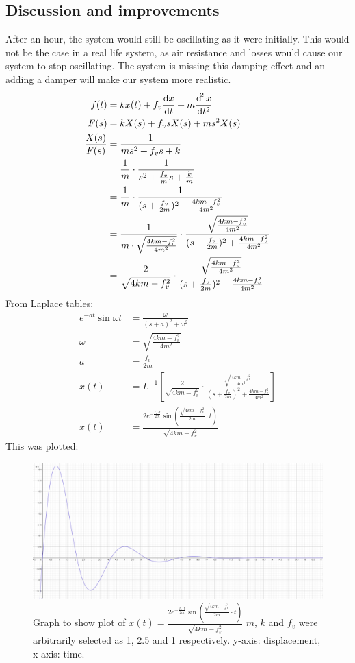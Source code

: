 \documentclass[12pt]{article}
\numberwithin{equation}{section}
\begin{document}
\subsection*{Discussion and improvements}
After an hour, the system would still be oscillating as it were initially. This would not be the case in a real life system, as air resistance and losses would cause our system to stop oscillating. The system is missing this damping effect and an adding a damper will make our system more realistic.
\begin{align}
  f(t) &= kx(t) + f_v \frac{\dif x}{\dif t} + m \frac{\dif ^2 x}{\dif t^2}\\
  F(s) &= kX(s) + f_v s X(s) + m s^2 X(s)\\
  \frac{X(s)}{F(s)} &= \frac{1}{ms^2 + f_v s + k}\\
  &= \frac{1}{m}\cdot \frac{1}{s^2 + \frac{f_v}{m}s + \frac{k}{m}}\\
  &= \frac{1}{m} \cdot \frac{1}{(s+\frac{f_v}{2m})^2 +\frac{4km - f_v^2}{4m^2}}\\
  &= \frac{1}{m \cdot \sqrt{\frac{4km - f_v^2}{4m^2}}} \cdot \frac{\sqrt{\frac{4km - f_v^2}{4m^2}}}{(s+\frac{f_v}{2m})^2 +\frac{4km - f_v^2}{4m^2}}\\
  &= \frac{2}{\sqrt{4km - f_v^2}} \cdot \frac{\sqrt{\frac{4km - f_v^2}{4m^2}}}{(s+\frac{f_v}{2m})^2 +\frac{4km - f_v^2}{4m^2}}
\end{align}
From Laplace tables: 
\begin{align}
  e^{-at}\sin{\omega t} &= \frac{\omega}{(s + a)^2 + \omega^2}\\
  \omega &= \sqrt{\frac{4km - f_v^2}{4m^2}}\\
  a &= \frac{f_v}{2m}\\
  x(t) &= L^{-1} \left[ \frac{2}{\sqrt{4km - f_v^2}} \cdot \frac{\sqrt{\frac{4km - f_v^2}{4m^2}}}{(s+\frac{f_v}{2m})^2 +\frac{4km - f_v^2}{4m^2}} \right]\\
  x(t) &= \frac{2e^{-\frac{f_v \cdot t}{2m}}\sin{\left(\frac{\sqrt{4km-f_v^2 }}{2m} \cdot t\right)}}{\sqrt{4km - f_v^2}}
\end{align}
This was plotted:
\begin{figure}[H]
  \centering
  \includegraphics[width=\textwidth]{./img/3-2timeresponsedamped.png}
  \caption{Graph to show plot of $x(t) = \frac{2e^{-\frac{f_v \cdot t}{2m}}\sin{\left(\frac{\sqrt{4km-f_v^2 }}{2m} \cdot t\right)}}{\sqrt{4km - f_v^2}}$ $m$, $k$ and $f_v$ were arbitrarily selected as 1, 2.5 and 1 respectively. y-axis: displacement, x-axis: time.}
\end{figure}
\end{document}
